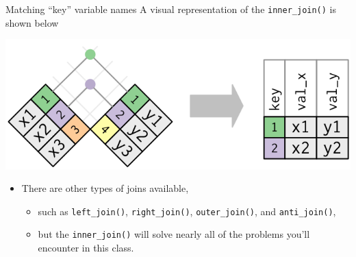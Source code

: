 \documentclass[
  ignorenonframetext,
]{beamer}
\providecommand{\tightlist}{%
  \setlength{\itemsep}{0pt}\setlength{\parskip}{0pt}}
\begin{document}
\begin{frame}[fragile]{Matching ``key'' variable names}
\protect\hypertarget{matching-key-variable-names-1}{}
A visual representation of the \texttt{inner\_join()} is shown below

\begin{center}\includegraphics[width=0.6\linewidth,height=0.3\textheight]{week3_6} \end{center}

\begin{itemize}
\item
  There are other types of joins available,

  \begin{itemize}
  \tightlist
  \item
    such as \texttt{left\_join()}, \texttt{right\_join()},
    \texttt{outer\_join()}, and \texttt{anti\_join()},
  \item
    but the \texttt{inner\_join()} will solve nearly all of the problems
    you'll encounter in this class.
  \end{itemize}
\end{itemize}
\end{frame}
\end{document}
